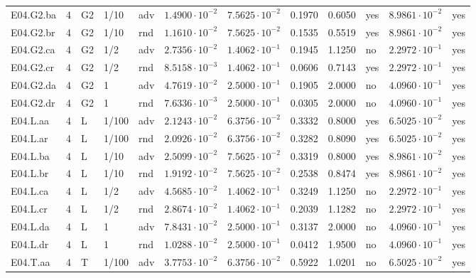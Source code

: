 {\begin{longtable}{@{}lllllllllll l@{}}
E04.G2.ba & 4 & G2 & 1/10 & adv & $1.4900\cdot 10^{-2}$ & $7.5625\cdot 10^{-2}$ & 0.1970 & 0.6050 & yes & $8.9861\cdot 10^{-2}$ & yes \\
E04.G2.br & 4 & G2 & 1/10 & rnd & $1.1610\cdot 10^{-2}$ & $7.5625\cdot 10^{-2}$ & 0.1535 & 0.5519 & yes & $8.9861\cdot 10^{-2}$ & yes \\
E04.G2.ca & 4 & G2 & 1/2 & adv & $2.7356\cdot 10^{-2}$ & $1.4062\cdot 10^{-1}$ & 0.1945 & 1.1250 & no & $2.2972\cdot 10^{-1}$ & yes \\
E04.G2.cr & 4 & G2 & 1/2 & rnd & $8.5158\cdot 10^{-3}$ & $1.4062\cdot 10^{-1}$ & 0.0606 & 0.7143 & yes & $2.2972\cdot 10^{-1}$ & yes \\
E04.G2.da & 4 & G2 & 1 & adv & $4.7619\cdot 10^{-2}$ & $2.5000\cdot 10^{-1}$ & 0.1905 & 2.0000 & no & $4.0960\cdot 10^{-1}$ & yes \\
E04.G2.dr & 4 & G2 & 1 & rnd & $7.6336\cdot 10^{-3}$ & $2.5000\cdot 10^{-1}$ & 0.0305 & 2.0000 & no & $4.0960\cdot 10^{-1}$ & yes \\
E04.L.aa & 4 & L & 1/100 & adv & $2.1243\cdot 10^{-2}$ & $6.3756\cdot 10^{-2}$ & 0.3332 & 0.8000 & yes & $6.5025\cdot 10^{-2}$ & yes \\
E04.L.ar & 4 & L & 1/100 & rnd & $2.0926\cdot 10^{-2}$ & $6.3756\cdot 10^{-2}$ & 0.3282 & 0.8090 & yes & $6.5025\cdot 10^{-2}$ & yes \\
E04.L.ba & 4 & L & 1/10 & adv & $2.5099\cdot 10^{-2}$ & $7.5625\cdot 10^{-2}$ & 0.3319 & 0.8000 & yes & $8.9861\cdot 10^{-2}$ & yes \\
E04.L.br & 4 & L & 1/10 & rnd & $1.9192\cdot 10^{-2}$ & $7.5625\cdot 10^{-2}$ & 0.2538 & 0.8474 & yes & $8.9861\cdot 10^{-2}$ & yes \\
E04.L.ca & 4 & L & 1/2 & adv & $4.5685\cdot 10^{-2}$ & $1.4062\cdot 10^{-1}$ & 0.3249 & 1.1250 & no & $2.2972\cdot 10^{-1}$ & yes \\
E04.L.cr & 4 & L & 1/2 & rnd & $2.8674\cdot 10^{-2}$ & $1.4062\cdot 10^{-1}$ & 0.2039 & 1.1282 & no & $2.2972\cdot 10^{-1}$ & yes \\
E04.L.da & 4 & L & 1 & adv & $7.8431\cdot 10^{-2}$ & $2.5000\cdot 10^{-1}$ & 0.3137 & 2.0000 & no & $4.0960\cdot 10^{-1}$ & yes \\
E04.L.dr & 4 & L & 1 & rnd & $1.0288\cdot 10^{-2}$ & $2.5000\cdot 10^{-1}$ & 0.0412 & 1.9500 & no & $4.0960\cdot 10^{-1}$ & yes \\
E04.T.aa & 4 & T & 1/100 & adv & $3.7753\cdot 10^{-2}$ & $6.3756\cdot 10^{-2}$ & 0.5922 & 1.0201 & no & $6.5025\cdot 10^{-2}$ & yes \\

\end{longtable}}
